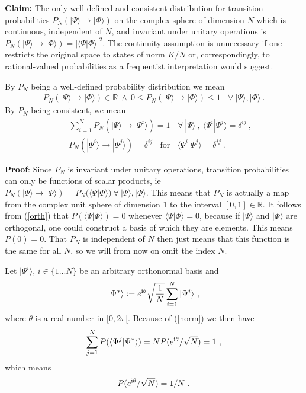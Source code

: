 \documentclass[11pt,twoside,A4]{article}
\def\beqn{\begin{eqnarray}}
\def\eeqn{\end{eqnarray}}
\begin{document}
{\bf Claim:} The only well-defined and consistent distribution for transition probabilities $P_N(|\Psi\rangle \to |\Phi\rangle)$ on the complex sphere of dimension $N$ which is continuous, independent of $N$, and invariant under unitary operations is $P_N(| \Psi \rangle \to |\Phi \rangle) = |\langle \Psi | \Phi \rangle|^2$. The continuity assumption is unnecessary if one restricts the original space to states of norm $K/N$ or, correspondingly, to rational-valued probabilities as a frequentist interpretation would suggest. 
\bigskip

\noindent By $P_N$ being a well-defined probability distribution we mean
\beqn
P_N(|\Psi\rangle \to |\Phi\rangle) \in \mathbb{R} ~\wedge~ 0 \leq P_N(|\Psi\rangle \to |\Phi\rangle) \leq 1 ~~~~\forall~ |\Psi \rangle, |\Phi \rangle ~. \label{welldef}
\eeqn
By $P_N$ being consistent, we mean
\beqn
&& \sum_{i=1}^N P_N(|\Psi\rangle \to |\Psi^i\rangle) = 1 ~~~~ \forall~ |\Psi \rangle~,~ \langle \Psi^i |\Psi^j\rangle = \delta^{ij} ~, \label{norm} \\
&& P_N(|\Psi^i\rangle \to |\Psi^j\rangle) = \delta^{ij} ~~~~ {\mbox{for}}~~~~ \langle \Psi^i |\Psi^j\rangle = \delta^{ij} \label{orth}~.
\eeqn

{\bf Proof}: Since $P_N$ is invariant under unitary operations, transition probabilities can only be functions of scalar products, ie 
$P_N(|\Psi \rangle \to |\Phi \rangle)  = P_N(\langle \Psi |\Phi \rangle) ~ \forall ~ |\Psi \rangle, |\Phi \rangle$. This means that $P_N$ is actually a map from the complex unit sphere of dimension 1 to the interval $[ 0,1] \in {\mathbb{R}}$. It follows from (\ref{orth}) that $P(\langle \Psi | \Phi \rangle) = 0$ whenever $\langle \Psi | \Phi \rangle =0$, because if $|\Psi \rangle$ and $|\Phi \rangle$ are orthogonal, one could construct a basis of which they are elements. This means $P(0) = 0$. That $P_N$ is independent of $N$ then just means that this function is the same for all $N$, so we will from now on omit the index $N$. 

Let $|\Psi^i \rangle$, $i \in \{1... N \}$ be an arbitrary orthonormal basis and
\beqn
|\Psi^* \rangle := e^{{\rm i} \theta} \sqrt{\frac{1}{N}} \sum_{i=1}^N |\Psi^i \rangle~,
\eeqn
where $\theta$ is a real number in $[0,2 \pi [$. Because of (\ref{norm}) we then have
\beqn
\sum_{j=1}^N P (\langle \Psi^j | \Psi^* \rangle)  = N  P( e^{{\rm i} \theta}/\sqrt{N}) =  1~,
\eeqn
which means
\beqn
P( e^{{\rm i} \theta} /\sqrt{N}) = 1/N ~. \label{1/N}
\eeqn
\end{document}
